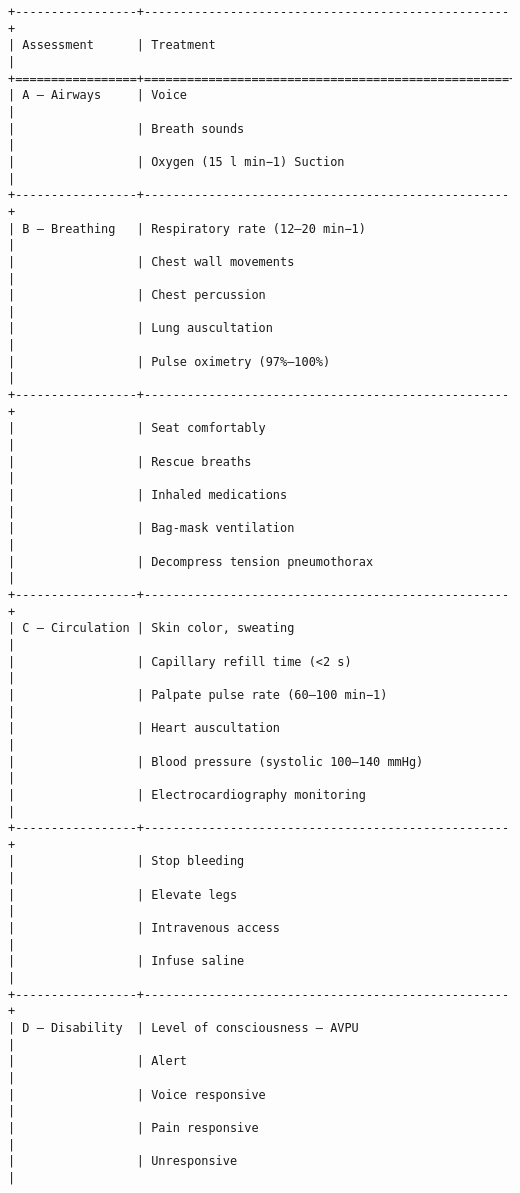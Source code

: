 \begin{lstlisting}
+-----------------+---------------------------------------------------+
| Assessment      | Treatment                                         |
+=================+===================================================+
| A – Airways     | Voice                                             |
|                 | Breath sounds                                     |
|                 | Oxygen (15 l min−1) Suction                       |
+-----------------+---------------------------------------------------+
| B – Breathing   | Respiratory rate (12–20 min−1)                    |
|                 | Chest wall movements                              |
|                 | Chest percussion                                  |
|                 | Lung auscultation                                 |
|                 | Pulse oximetry (97%–100%)                         |
+-----------------+---------------------------------------------------+
|                 | Seat comfortably                                  |
|                 | Rescue breaths                                    |
|                 | Inhaled medications                               |
|                 | Bag-mask ventilation                              |
|                 | Decompress tension pneumothorax                   |
+-----------------+---------------------------------------------------+
| C – Circulation | Skin color, sweating                              |
|                 | Capillary refill time (<2 s)                      |
|                 | Palpate pulse rate (60–100 min−1)                 |
|                 | Heart auscultation                                |
|                 | Blood pressure (systolic 100–140 mmHg)            |
|                 | Electrocardiography monitoring                    |
+-----------------+---------------------------------------------------+
|                 | Stop bleeding                                     |
|                 | Elevate legs                                      |
|                 | Intravenous access                                |
|                 | Infuse saline                                     |
+-----------------+---------------------------------------------------+
| D – Disability  | Level of consciousness – AVPU                     |
|                 | Alert                                             |
|                 | Voice responsive                                  |
|                 | Pain responsive                                   |
|                 | Unresponsive                                      |

\end{lstlisting}
